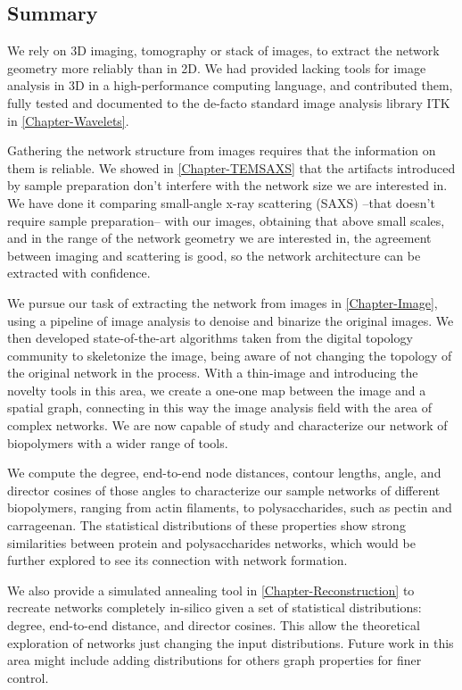 \subsection{Summary}%
\label{sub:summary}


We rely on 3D imaging, tomography or stack of images, to extract the network geometry more reliably than in 2D. We had provided lacking tools for image analysis in 3D in a high-performance computing language, and contributed them, fully tested and documented to the de-facto standard image analysis library ITK in \autoref{Chapter-Wavelets}.

Gathering the network structure from images requires that the information on them is reliable. We showed in \autoref{Chapter-TEMSAXS} that the artifacts introduced by sample preparation don't interfere with the network size we are interested in. We have done it comparing small-angle x-ray scattering (SAXS) --that doesn't require sample preparation-- with our images, obtaining that above small scales, and in the range of the network geometry we are interested in, the agreement between imaging and scattering is good, so the network architecture can be extracted with confidence.

We pursue our task of extracting the network from images in \autoref{Chapter-Image}, using a pipeline of image analysis to denoise and binarize the original images. We then developed state-of-the-art algorithms taken from the digital topology community to skeletonize the image, being aware of not changing the topology of the original network in the process. With a thin-image and introducing the novelty tools in this area, we create a one-one map between the image and a spatial graph, connecting in this way the image analysis field with the area of complex networks. We are now capable of study and characterize our network of biopolymers with a wider range of tools.

We compute the degree, end-to-end node distances, contour lengths, angle, and director cosines of those angles to characterize our sample networks of different biopolymers, ranging from actin filaments, to polysaccharides, such as pectin and carrageenan. The statistical distributions of these properties show strong similarities between protein and polysaccharides networks, which would be further explored to see its connection with network formation.

We also provide a simulated annealing tool in \autoref{Chapter-Reconstruction} to recreate networks completely in-silico given a set of statistical distributions: degree, end-to-end distance, and director cosines. This allow the theoretical exploration of networks just changing the input distributions. Future work in this area might include adding distributions for others graph properties for finer control.

